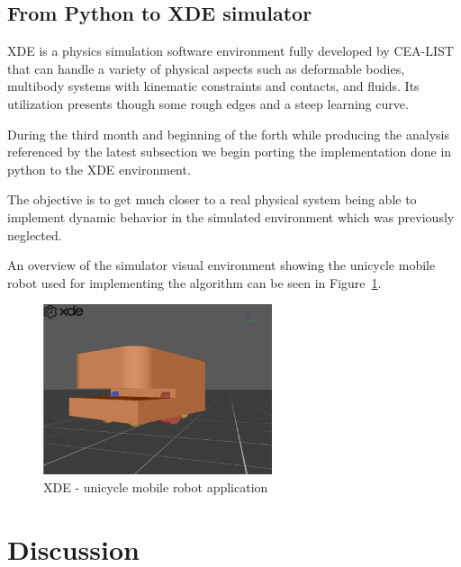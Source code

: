 \subsection{From Python to XDE simulator}

XDE is a physics simulation software environment fully developed by CEA-LIST that can handle a variety of physical aspects such as deformable bodies, multibody systems with kinematic constraints and contacts, and fluids. Its utilization presents though some rough edges and a steep learning curve.

During the third month and beginning of the forth while producing the analysis referenced by the latest subsection we begin porting the implementation done in python to the XDE environment. 

The objective is to get much closer to a real physical system being able to implement dynamic behavior in the simulated environment which was previously neglected.

An overview of the simulator visual environment showing the unicycle mobile robot used for implementing the algorithm can be seen in Figure~\ref{fig:xde}.
\clearpage
\begin{figure}[!h]
	\centering
	\includegraphics[width=0.6\textwidth]{./images/xde4.png}
	\caption{XDE - unicycle mobile robot application\label{fig:xde}}
\end{figure}


\section{Discussion}

